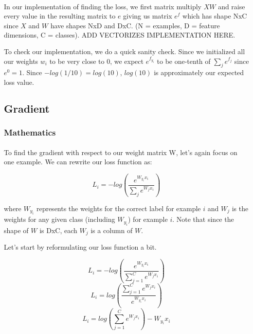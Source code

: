 \documentclass[12pt]{article}
\begin{document}
\paragraph{} 
In our implementation of finding the loss, we first matrix 
multiply $XW$ and raise every value in the resulting matrix to $e$
giving us matrix $e^{f}$ which has shape NxC since $X$ and $W$ 
have shapes NxD and DxC.
(N = examples, D = feature dimensions, C = classes). ADD VECTORIZES IMPLEMENTATION HERE.

To check our implementation, we do a quick sanity check. 
Since we initialized all our weights $w_{i}$ to be very close to 0, we
expect $e^{f_{y_{i}}}$ to be one-tenth of $\sum_{j} e^{f_{j}}$ since 
$e^{0} = 1$. Since $-log(1/10) = log(10)$, $log(10)$ is approximately our 
expected loss value. 

\subsection{Gradient}

\subsubsection{Mathematics}
\paragraph{}
To find the gradient with respect to our weight 
matrix W, let's again focus on one example. We can rewrite our loss function as:

\begin{equation}
    L_{i} = -log(\frac{e^{W_{y_{i}}x_{i}}}{\sum_{j} e^{W_{j}x_{i}}}) 
\end{equation}

where $W_{y_{i}}$ represents the weights for the correct label for example $i$ and $W_{j}$ 
is the weights for any given class (including $W_{y_{i}}$) for example $i$. 
Note that since the shape 
of $W$ is DxC, each $W_{j}$ is a column of $W$. 

Let's start by reformulating our loss function a bit.

\begin{equation}
    L_{i} = -log(\frac{e^{W_{y_{i}}x_{i}}}{\sum_{j=1}^C e^{W_{j}x_{i}}}) 
\end{equation}
\begin{equation}
    L_{i} = log(\frac{\sum_{j=1}^C e^{W_{j}x_{i}}}{e^{W_{y_{i}}x_{i}}}) 
\end{equation}
\begin{equation}
    L_{i} = log({\sum_{j=1}^C e^{W_{j}x_{i}}}) - W_{y_{i}}x_{i}
\end{equation}
\end{document}
